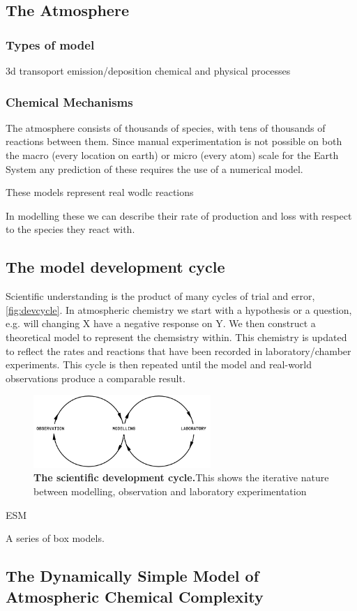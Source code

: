 \subsection{The Atmosphere}

\subsubsection{Types of model}
3d transoport emission/deposition chemical and physical processes 




\subsubsection{Chemical Mechanisms}
The atmosphere consists of thousands of species, with tens of thousands of reactions between them. Since manual experimentation is not possible on both the macro (every location on earth) or micro (every atom) scale for the Earth System any prediction of these requires the use of a numerical model. 


These models represent real wodlc reactions 


In modelling these we can describe their rate of production and loss with respect to the species they react with. 



\subsection{The model development cycle}
Scientific understanding is the product of many cycles of trial and error, \autoref{fig:devcycle}. In atmospheric chemistry we start with a hypothesis or a question, e.g. will changing X have a negative response on Y. We then construct a theoretical model to represent the chemsistry within. This chemistry is updated to reflect the rates and reactions that have been recorded in laboratory/chamber experiments. This cycle is then repeated until the model and real-world observations produce a comparable result. 

\begin{figure}[H]
    \centering
    \includegraphics[width=0.6\textwidth]{devcycle.png}
    \caption{\textbf{The scientific development cycle.}This shows the iterative nature between modelling, observation and laboratory experimentation}
    \label{fig:devcycle}
\end{figure}






ESM 

 A series of box models.
 
 
 \subsection{The Dynamically Simple Model of Atmospheric Chemical Complexity}
 
 





